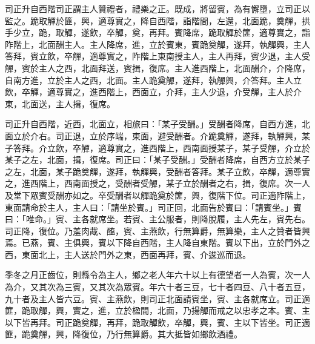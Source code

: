 \begin{pinyinscope}
 司正升自西階司正謂主人贊禮者，禮樂之正。既成，將留賓，為有懈墮，立司正以監之。跪取觶於篚，興，適尊實之，降自西階，詣階間，左還，北面跪，奠觶，拱手少立，跪，取觶，遂飲，卒觶，奠，再拜。賓降席，跪取觶於篚，適尊實之，詣阼階上，北面酬主人。主人降席，進，立於賓東，賓跪奠觶，遂拜，執觶興，主人答拜，賓立飲，卒觶，適尊實之，阼階上東南授主人，主人再拜，賓少退，主人受觶，賓於主人之西，北面拜送，賓揖，復席。主人進西階上，北面酬介，介降席，自南方進，立於主人之西，北面。主人跪奠觶，遂拜，執觶興，介答拜。主人立飲，卒觶，適尊實之，進西階上，西面立，介拜，主人少退，介受觶，主人於介東，北面送，主人揖，復席。



 司正升自西階，近西，北面立，相旅曰：「某子受酬。」受酬者降席，自西方進，北面立於介右。司正退，立於序端，東面，避受酬者。介跪奠觶，遂拜，執觶興，某子答拜。介立飲，卒觶，適尊實之，進西階上，西南面授某子，某子受觶，介立於某子之左，北面，揖，復席。司正曰：「某子受酬。」受酬者降席，自西方立於某子之左，北面，某子跪奠觶，遂拜，執觶興，受酬者答拜。某子立飲，卒觶，適尊實之，進西階上，西南面授之，受酬者受觶，某子立於酬者之右，揖，復席。次一人及堂下眾賓受酬亦如之。卒受酬者以觶跪奠於篚，興，復階下位。司正適阼階上，東面請命於主人，主人曰：「請坐於賓。」司正回，北面告於賓曰：「請賓坐。」賓曰：「唯命。」賓、主各就席坐。若賓、主公服者，則降脫履，主人先左，賓先右。司正降，復位。乃羞肉胾、醢，賓、主燕飲，行無算爵，無算樂，主人之贊者皆興焉。已燕，賓、主俱興，賓以下降自西階，主人降自東階。賓以下出，立於門外之西，東面北上，主人送於門外之東，西面再拜，賓、介逡巡而退。



 季冬之月正齒位，則縣令為主人，鄉之老人年六十以上有德望者一人為賓，次一人為介，又其次為三賓，又其次為眾賓。年六十者三豆，七十者四豆、八十者五豆，九十者及主人皆六豆。賓、主燕飲，則司正北面請賓坐，賓、主各就席立。司正適篚，跪取觶，興，實之，進，立於楹間，北面，乃揚觶而戒之以忠孝之本。賓、主以下皆再拜。司正跪奠觶，再拜，跪取觶飲，卒觶，興，賓、主以下皆坐。司正適篚，跪奠觶，興，降復位，乃行無算爵。其大抵皆如鄉飲酒禮。



\end{pinyinscope}